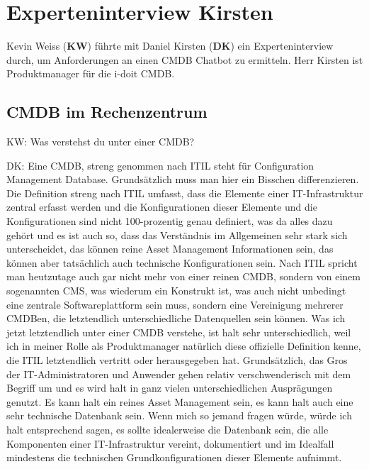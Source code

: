 \chapter{Experteninterview Kirsten}\label{Interview_Kirsten}

Kevin Weiss (\textbf{KW}) führte mit Daniel Kirsten (\textbf{DK}) ein Experteninterview  durch, um Anforderungen an einen CMDB Chatbot zu ermitteln. Herr Kirsten ist Produktmanager für die i-doit CMDB.

\section*{CMDB im Rechenzentrum}

\begin{list}{X:}{\setlength{\labelsep}{5mm}}
\item[KW:] Was verstehst du unter einer CMDB?
\item[DK:] Eine CMDB, streng genommen nach ITIL steht für Configuration Management Database. Grundsätzlich muss man hier ein Bisschen differenzieren. Die Definition streng nach ITIL umfasst, dass die Elemente einer IT-Infrastruktur zentral erfasst werden und die Konfigurationen dieser Elemente und die Konfigurationen sind nicht 100-prozentig genau definiert, was da alles dazu gehört und es ist auch so, dass das Verständnis im Allgemeinen sehr stark sich unterscheidet, das können reine Asset Management Informationen sein, das können aber tatsächlich auch technische Konfigurationen sein. Nach ITIL spricht man heutzutage auch gar nicht mehr von einer reinen CMDB, sondern von einem sogenannten CMS, was wiederum ein Konstrukt ist, was auch nicht unbedingt eine zentrale Softwareplattform sein muss, sondern eine Vereinigung mehrerer CMDBen, die letztendlich unterschiedliche Datenquellen sein können. Was ich jetzt letztendlich unter einer CMDB verstehe, ist halt sehr unterschiedlich, weil ich in meiner Rolle als Produktmanager natürlich diese offizielle Definition kenne, die ITIL letztendlich vertritt oder herausgegeben hat. Grundsätzlich, das Gros der IT-Administratoren und Anwender gehen relativ verschwenderisch mit dem Begriff um und es wird halt in ganz vielen unterschiedlichen Ausprägungen genutzt. Es kann halt ein reines Asset Management sein, es kann halt auch eine sehr technische Datenbank sein. Wenn mich so jemand fragen würde, würde ich halt entsprechend sagen, es sollte idealerweise die Datenbank sein, die alle Komponenten einer IT-Infrastruktur vereint, dokumentiert und im Idealfall mindestens die technischen Grundkonfigurationen dieser Elemente aufnimmt.

\end{list}
